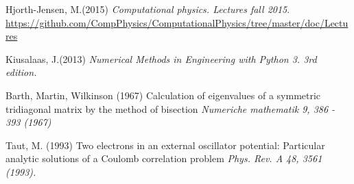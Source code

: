 \documentclass{article}
\begin{document}
\pagebreak
\begin{thebibliography}{9}
	Hjorth-Jensen, M.(2015)
	\textit{Computational physics. Lectures fall 2015}. 
	\url{https://github.com/CompPhysics/ComputationalPhysics/tree/master/doc/Lectures}
	
	
	Kiusalaas, J.(2013)
	\textit{Numerical Methods in Engineering with Python 3. 3rd edition.}
	
	Barth, Martin, Wilkinson (1967)
	Calculation of eigenvalues of a symmetric tridiagonal matrix by the method of bisection \textit{Numeriche mathematik 9, 386 - 393 (1967)}
	
	Taut, M. (1993)
	Two electrons in an external oscillator potential: Particular analytic solutions of a Coulomb correlation problem \textit{Phys. Rev. A 48, 3561 (1993).}
	


\end{thebibliography}
\end{document}

